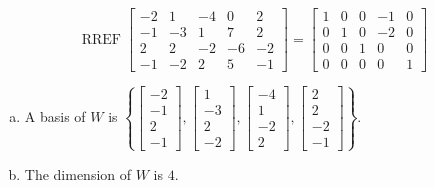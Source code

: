 \begin{exerciseAnswer} 


\[\operatorname{RREF} \left[\begin{array}{ccccc}
-2 & 1 & -4 & 0 & 2 \\
-1 & -3 & 1 & 7 & 2 \\
2 & 2 & -2 & -6 & -2 \\
-1 & -2 & 2 & 5 & -1
\end{array}\right] = \left[\begin{array}{ccccc}
1 & 0 & 0 & -1 & 0 \\
0 & 1 & 0 & -2 & 0 \\
0 & 0 & 1 & 0 & 0 \\
0 & 0 & 0 & 0 & 1
\end{array}\right] \]


\begin{enumerate}[(a)]
\item A basis of \(W\) is \( \left\{ \left[\begin{array}{c}
-2 \\
-1 \\
2 \\
-1
\end{array}\right] , \left[\begin{array}{c}
1 \\
-3 \\
2 \\
-2
\end{array}\right] , \left[\begin{array}{c}
-4 \\
1 \\
-2 \\
2
\end{array}\right] , \left[\begin{array}{c}
2 \\
2 \\
-2 \\
-1
\end{array}\right] \right\} \).
\item The dimension of \(W\) is \( 4 \).
\end{enumerate}
    
\end{exerciseAnswer}
    
